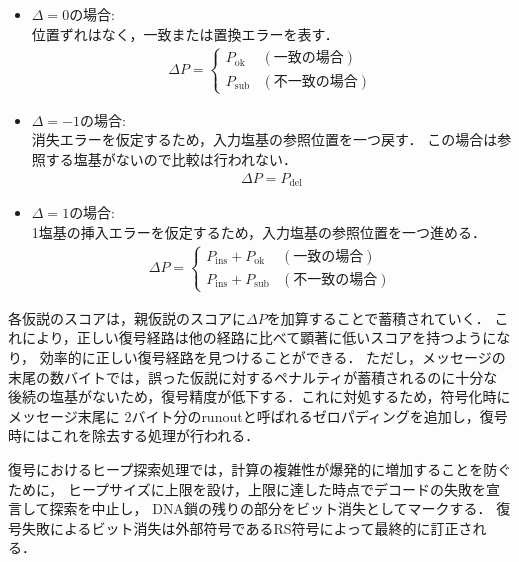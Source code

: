 \documentclass[sotsuron]{kuee}
\begin{document}
\begin{itemize}
  \item $\Delta = 0$の場合: \\ 位置ずれはなく，一致または置換エラーを表す．
  \begin{align}
    \Delta P = \begin{cases}
      P_{\mathrm{ok}} & (\text{一致の場合}) \\
      P_{\mathrm{sub}} & (\text{不一致の場合})
    \end{cases}
  \end{align}
  \item $\Delta = -1$の場合:\\ 消失エラーを仮定するため，入力塩基の参照位置を一つ戻す．
  この場合は参照する塩基がないので比較は行われない． 
  \begin{align}
    \Delta P = P_{\mathrm{del}}
  \end{align}
  \item $\Delta = 1$の場合: \\ 1塩基の挿入エラーを仮定するため，入力塩基の参照位置を一つ進める．
  \begin{align}
    \Delta P = \begin{cases}
      P_{\mathrm{ins}} + P_{\mathrm{ok}} & (\text{一致の場合}) \\
      P_{\mathrm{ins}} + P_{\mathrm{sub}} & (\text{不一致の場合})
    \end{cases}
  \end{align}
\end{itemize}
各仮説のスコアは，親仮説のスコアに$\Delta P$を加算することで蓄積されていく．
これにより，正しい復号経路は他の経路に比べて顕著に低いスコアを持つようになり，
効率的に正しい復号経路を見つけることができる．
ただし，メッセージの末尾の数バイトでは，誤った仮説に対するペナルティが蓄積されるのに十分な
後続の塩基がないため，復号精度が低下する．これに対処するため，符号化時にメッセージ末尾に
2バイト分のrunoutと呼ばれるゼロパディングを追加し，復号時にはこれを除去する処理が行われる．

復号におけるヒープ探索処理では，計算の複雑性が爆発的に増加することを防ぐために，
ヒープサイズに上限を設け，上限に達した時点でデコードの失敗を宣言して探索を中止し，
DNA鎖の残りの部分をビット消失としてマークする．
復号失敗によるビット消失は外部符号であるRS符号によって最終的に訂正される．
\end{document}
